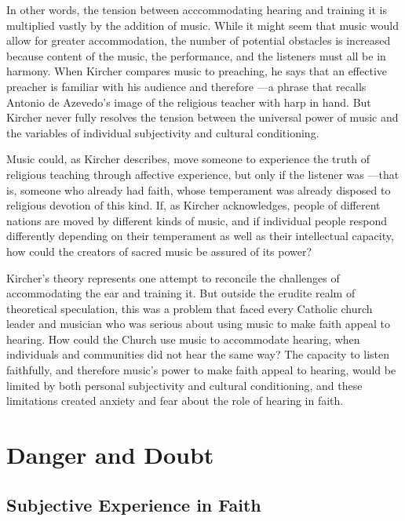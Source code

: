 In other words, the tension between acccommodating hearing and training it is 
multiplied vastly by the addition of music.
While it might seem that music would allow for greater accommodation, the 
number of potential obstacles is increased because content of the music, the 
performance, and the listeners must all be in harmony.
When Kircher compares music to preaching, he says that an effective preacher is 
familiar with his audience and therefore ---a phrase that recalls Antonio de Azevedo's image of the religious 
teacher with harp in hand.%
    \Autocite
    [551: .]
    {Kircher:Musurgia}
But Kircher never fully resolves the tension between the universal power of 
music and the variables of individual subjectivity and cultural conditioning.

Music could, as Kircher describes, move someone to experience the truth of 
religious teaching through affective experience, but only if the listener was 
---that is, someone who already 
had faith, whose temperament was already disposed to religious devotion of this 
kind. 
If, as Kircher acknowledges, people of different nations are moved by different 
kinds of music, and if individual people respond differently depending on their 
temperament as well as their intellectual capacity, how could the creators of 
sacred music be assured of its power?

Kircher's theory represents one attempt to reconcile the challenges of 
accommodating the ear and training it. 
But outside the erudite realm of theoretical speculation, this was a problem 
that faced every Catholic church leader and musician who was serious about 
using music to make faith appeal to hearing.
How could the Church use music to accommodate hearing, when individuals and 
communities did not hear the same way? 
The capacity to listen faithfully, and therefore music's power to make faith 
appeal to hearing, would be limited by both personal subjectivity and cultural 
conditioning, and these limitations created anxiety and fear about the role of 
hearing in faith.

\section{Danger and Doubt}

\subsection{Subjective Experience in Faith}

